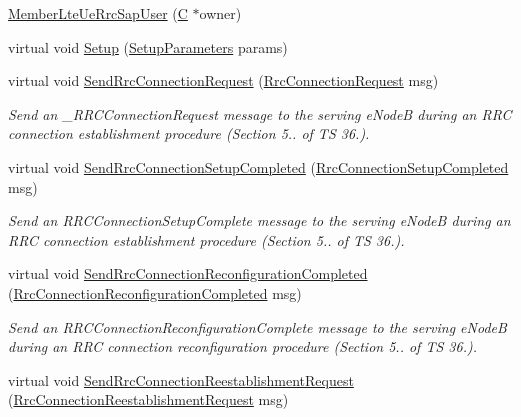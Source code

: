 \begin{DoxyCompactItemize}
\item 
\hyperlink{classns3_1_1MemberLteUeRrcSapUser_ae825e6f00de03375d3567fcc9a719b9f}{Member\+Lte\+Ue\+Rrc\+Sap\+User} (\hyperlink{loss__COST231__small__cities__urban_8m_aaa53ca0b650dfd85c4f59fa156f7a2cc}{C} $\ast$owner)
\item 
virtual void \hyperlink{classns3_1_1MemberLteUeRrcSapUser_a8d35ee32743a14f3847ebae0876f3c8c}{Setup} (\hyperlink{structns3_1_1LteUeRrcSapUser_1_1SetupParameters}{Setup\+Parameters} params)
\item 
virtual void \hyperlink{classns3_1_1MemberLteUeRrcSapUser_a3b5d09935c755635a2278153f5a1e4f4}{Send\+Rrc\+Connection\+Request} (\hyperlink{structns3_1_1LteRrcSap_1_1RrcConnectionRequest}{Rrc\+Connection\+Request} msg)
\begin{DoxyCompactList}\small\item\em Send an \+\_\+\+R\+R\+C\+Connection\+Request message to the serving e\+NodeB during an R\+RC connection establishment procedure (Section 5.. of TS 36.). \end{DoxyCompactList}\item 
virtual void \hyperlink{classns3_1_1MemberLteUeRrcSapUser_a13f6ac9d541033e10ff2019a6cb1729e}{Send\+Rrc\+Connection\+Setup\+Completed} (\hyperlink{structns3_1_1LteRrcSap_1_1RrcConnectionSetupCompleted}{Rrc\+Connection\+Setup\+Completed} msg)
\begin{DoxyCompactList}\small\item\em Send an {\itshape R\+R\+C\+Connection\+Setup\+Complete} message to the serving e\+NodeB during an R\+RC connection establishment procedure (Section 5.. of TS 36.). \end{DoxyCompactList}\item 
virtual void \hyperlink{classns3_1_1MemberLteUeRrcSapUser_a0841d6565104aa9381f8ed76598ad3bf}{Send\+Rrc\+Connection\+Reconfiguration\+Completed} (\hyperlink{structns3_1_1LteRrcSap_1_1RrcConnectionReconfigurationCompleted}{Rrc\+Connection\+Reconfiguration\+Completed} msg)
\begin{DoxyCompactList}\small\item\em Send an {\itshape R\+R\+C\+Connection\+Reconfiguration\+Complete} message to the serving e\+NodeB during an R\+RC connection reconfiguration procedure (Section 5.. of TS 36.). \end{DoxyCompactList}\item 
virtual void \hyperlink{classns3_1_1MemberLteUeRrcSapUser_a1e7c34f835d8b683c99c69adc29274b6}{Send\+Rrc\+Connection\+Reestablishment\+Request} (\hyperlink{structns3_1_1LteRrcSap_1_1RrcConnectionReestablishmentRequest}{Rrc\+Connection\+Reestablishment\+Request} msg)

\end{DoxyCompactItemize}
